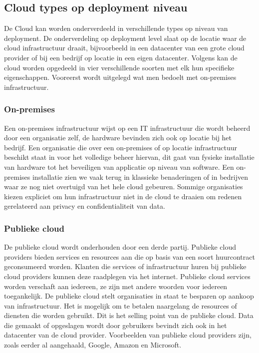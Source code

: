 \subsection{Cloud types op deployment niveau}
\label{cloud-deployment-level}
De Cloud kan worden onderverdeeld in verschillende types op niveau van deployment. De onderverdeling op deployment level slaat op de locatie waar de cloud infrastructuur draait, bijvoorbeeld in een datacenter van een grote cloud provider of bij een bedrijf op locatie in een eigen datacenter. Volgens \textcite{Goyal2014} kan de cloud worden opgedeeld in vier verschillende soorten met elk hun specifieke eigenschappen. Vooreerst wordt uitgelegd wat men bedoelt met on-premises infrastructuur.

\subsubsection{On-premises}
Een on-premises infrastructuur wijst op een IT infrastructuur die wordt beheerd door een organisatie zelf, de hardware bevinden zich ook op locatie bij het bedrijf. Een organisatie die over een on-premises of op locatie infrastructuur beschikt staat in voor het volledige beheer hiervan, dit gaat van fysieke installatie van hardware tot het beveiligen van applicatie op niveau van software. Een on-premises installatie zien we vaak terug in klassieke benaderingen of in bedrijven waar ze nog niet overtuigd van het hele cloud gebeuren. Sommige organisaties kiezen expliciet om hun infrastructuur niet in de cloud te draaien om redenen gerelateerd aan privacy en confidentialiteit van data.

\subsubsection{Publieke cloud}
De publieke cloud wordt onderhouden door een derde partij. Publieke cloud providers bieden services en resources aan die op basis van een soort huurcontract geconsumeerd worden. Klanten die services of infrastructuur huren bij publieke cloud providers kunnen deze raadplegen via het internet. Publieke cloud services worden verschaft aan iedereen, ze zijn met andere woorden voor iedereen toegankelijk. De publieke cloud stelt organisaties in staat te besparen op aankoop van infrastructuur. Het is mogelijk om te betalen naargelang de resources of diensten die worden gebruikt. Dit is het selling point van de publieke cloud. Data die gemaakt of opgeslagen wordt door gebruikers bevindt zich ook in het datacenter van de cloud provider. Voorbeelden van publieke cloud providers zijn, zoals eerder al aangehaald, Google, Amazon en Microsoft.

